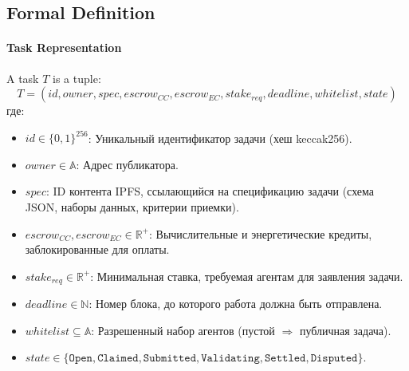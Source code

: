 \documentclass[11pt]{article}
\begin{document}
\subsection{Formal Definition}
\paragraph{Task Representation} A task $T$ is a tuple:
\begin{equation}
T = (id, owner, spec, escrow_{CC}, escrow_{EC}, stake_{req}, deadline, whitelist, state)
\end{equation}
где:
\begin{itemize}[noitemsep]
  \item $id \in \{0,1\}^{256}$: Уникальный идентификатор задачи (хеш keccak256).
  \item $owner \in \mathbb{A}$: Адрес публикатора.
  \item $spec$: ID контента IPFS, ссылающийся на спецификацию задачи (схема JSON, наборы данных, критерии приемки).
  \item $escrow_{CC}, escrow_{EC} \in \mathbb{R}^+$: Вычислительные и энергетические кредиты, заблокированные для оплаты.
  \item $stake_{req} \in \mathbb{R}^+$: Минимальная ставка, требуемая агентам для заявления задачи.
  \item $deadline \in \mathbb{N}$: Номер блока, до которого работа должна быть отправлена.
  \item $whitelist \subseteq \mathbb{A}$: Разрешенный набор агентов (пустой $\Rightarrow$ публичная задача).
  \item $state \in \{\texttt{Open}, \texttt{Claimed}, \texttt{Submitted}, \texttt{Validating}, \texttt{Settled}, \texttt{Disputed}\}$.
\end{itemize}
\end{document}
